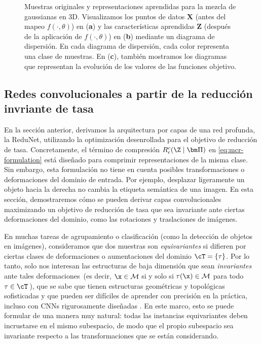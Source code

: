 \documentclass[../../book-main.tex]{subfiles}
\begin{document}
\begin{example}
\begin{figure}[t]
\begin{subfigure}[t]{0.32\textwidth}
        \end{subfigure}
        \vspace{-0.1in}
        \caption{\small Muestras originales y representaciones aprendidas
            para la mezcla de gaussianas en 3D. Visualizamos los puntos de datos
            $\bm{X}$ (antes del mapeo $f(\cdot, \theta)$) en
            (\textbf{a}) y las características aprendidas $\bm{Z}$ (después de la aplicación de
            $f(\cdot, \theta)$) en (\textbf{b}) mediante un diagrama de dispersión. En
            cada diagrama de dispersión, cada color representa una clase de
            muestras. En (\textbf{c}), también mostramos los diagramas que representan la
        evolución de los valores de las funciones objetivo.}
        \label{fig:redu-3d-gaussian-diagram}
    \end{figure}

\end{example}

\subsection{Redes convolucionales a partir de la reducción invriante de tasa}\label{sec:shift-invariant}

En la sección anterior, derivamos la arquitectura por capas de una
red profunda, la ReduNet, utilizando la optimización desenrollada para el objetivo
de reducción de tasa.
Concretamente, el término de compresión $R^c_\epsilon(\Z \mid\bm \Pi)$ en
\eqref{eq:mcr-formulation} está diseñado para comprimir representaciones
de la misma clase. Sin embargo, esta formulación no tiene en cuenta
posibles transformaciones o deformaciones del dominio de entrada. Por
ejemplo, desplazar ligeramente un objeto hacia la derecha no cambia
la etiqueta semántica de una imagen.  En esta sección, demostraremos
cómo se pueden derivar capas convolucionales maximizando un objetivo de
reducción de tasa que sea invariante ante ciertas deformaciones del dominio,
como las rotaciones y traslaciones de imágenes.

En muchas tareas de agrupamiento o clasificación (como la detección de objetos
en imágenes), consideramos que dos muestras son {\em equivariantes} si
difieren por ciertas clases de deformaciones o aumentaciones del dominio
$\cT = \{\tau \}$. Por lo tanto, solo nos interesan las estructuras de baja dimensión
que sean {\em invariantes} ante tales deformaciones~(es decir, $\x
\in \mathcal{M}$ si y solo si $\tau(\x) \in \mathcal{M}$ para todo $\tau \in \cT$\,),
que se sabe que tienen estructuras geométricas y topológicas sofisticadas
y que pueden ser difíciles de aprender con precisión en la práctica, incluso
con CNNs rigurosamente diseñadas \cite{Cohen-ICML-2016}.
En este marco, esto se puede formular de una manera muy natural: todas las
instancias equivariantes deben incrustarse en el mismo subespacio, de modo
que el propio subespacio sea invariante respecto a las transformaciones que
se están considerando.
\end{document}
